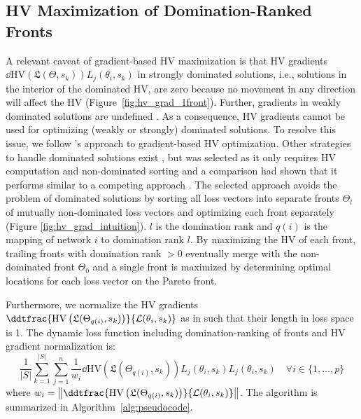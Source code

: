 \subsection{HV Maximization of Domination-Ranked Fronts}
\label{sec:domination_ranking}
A relevant caveat of gradient-based HV maximization is that HV gradients $\dd{\mathrm{HV}\left( \mathfrak{L}(\Theta,s_{k}) \right)}{L_{j}(\theta_{i},s_{k})}$ in strongly dominated solutions, i.e., solutions in the interior of the dominated HV, are zero \citep{emmerich2014time} because no movement in any direction will affect the HV (Figure~\ref{fig:hv_grad_1front}). Further, gradients in weakly dominated solutions are undefined \citep{emmerich2014time}. As a consequence, HV gradients cannot be used for optimizing (weakly or strongly) dominated solutions. To resolve this issue, we follow \cite{wang2017hypervolume}'s approach to gradient-based HV optimization. Other strategies to handle dominated solutions exist \citep{wang2017steering,deist2020multi}, but \cite{wang2017hypervolume} was selected as it only requires HV computation and non-dominated sorting and a comparison had shown that it performs similar to a competing approach \citep{deist2020multi}. The selected approach avoids the problem of dominated solutions by sorting all loss vectors into separate fronts $\Theta_{l}$ of mutually non-dominated loss vectors and optimizing each front separately (Figure \ref{fig:hv_grad_intuition}).
$l$ is the domination rank and $q(i)$ is the mapping of network $i$ to domination rank $l$. By maximizing the HV of each front, trailing fronts with domination rank $>0$ eventually merge with the non-dominated front $\Theta_{0}$ and a single front is maximized by determining optimal locations for each loss vector on the Pareto front.

Furthermore, we normalize the HV gradients $\ddtfrac{\mathrm{HV}\left(\mathfrak{L}(\Theta_{q(i)},s_{k}) \right)}{\mathcal{L}(\theta_{i},s_{k})}$ as in \cite{deist2020multi} such that their length in loss space is 1. The dynamic loss function including domination-ranking of fronts and HV gradient normalization is:
\begin{equation}
\frac{1}{|S|}
 \sum_{k=1}^{|S|}
 \sum_{j=1}^{n}
 \frac{1}{w_{i}}\dd{\mathrm{HV}\left(\mathfrak{L}(\Theta_{q(i)},s_{k}) \right)}{L_{j}(\theta_{i},s_{k})}
 L_{j}(\theta_{i},s_{k})
 \label{eq:final_joint_loss}
 \quad \forall i\in\{1,\dots,p\}
\end{equation}
where $w_{i} = \left\Vert \ddtfrac{\mathrm{HV}\left(\mathfrak{L}(\Theta_{q(i)},s_{k}) \right)}{\mathcal{L}(\theta_{i},s_{k})} \right\Vert$. The algorithm is summarized in Algorithm~\ref{alg:pseudocode}.

